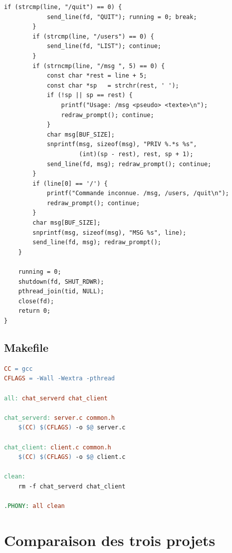 \documentclass[12pt,a4paper]{article}
\begin{document}
\begin{lstlisting}[caption={\texttt{client.c}, client interactif du hub}]
        if (strcmp(line, "/quit") == 0) {
            send_line(fd, "QUIT"); running = 0; break;
        }
        if (strcmp(line, "/users") == 0) {
            send_line(fd, "LIST"); continue;
        }
        if (strncmp(line, "/msg ", 5) == 0) {
            const char *rest = line + 5;
            const char *sp   = strchr(rest, ' ');
            if (!sp || sp == rest) {
                printf("Usage: /msg <pseudo> <texte>\n");
                redraw_prompt(); continue;
            }
            char msg[BUF_SIZE];
            snprintf(msg, sizeof(msg), "PRIV %.*s %s",
                     (int)(sp - rest), rest, sp + 1);
            send_line(fd, msg); redraw_prompt(); continue;
        }
        if (line[0] == '/') {
            printf("Commande inconnue. /msg, /users, /quit\n");
            redraw_prompt(); continue;
        }
        char msg[BUF_SIZE];
        snprintf(msg, sizeof(msg), "MSG %s", line);
        send_line(fd, msg); redraw_prompt();
    }

    running = 0;
    shutdown(fd, SHUT_RDWR);
    pthread_join(tid, NULL);
    close(fd);
    return 0;
}
\end{lstlisting}

\subsection{Makefile}

\begin{lstlisting}[language=make, caption={Makefile, compilation du hub et du client}]
CC = gcc
CFLAGS = -Wall -Wextra -pthread

all: chat_serverd chat_client

chat_serverd: server.c common.h
	$(CC) $(CFLAGS) -o $@ server.c

chat_client: client.c common.h
	$(CC) $(CFLAGS) -o $@ client.c

clean:
	rm -f chat_serverd chat_client

.PHONY: all clean
\end{lstlisting}

\section{Comparaison des trois projets}
\end{document}
